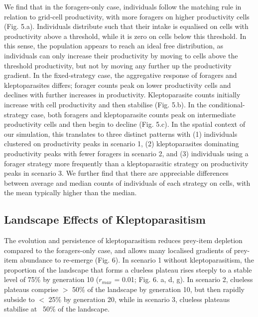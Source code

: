 \documentclass[11pt]{article}
\begin{document}
We find that in the foragers-only case, individuals follow the matching rule in relation to grid-cell productivity, with more foragers on higher productivity cells (Fig. 5.a).
Individuals distribute such that their intake is equalised on cells with productivity above a threshold, while it is zero on cells below this threshold.
In this sense, the population appears to reach an ideal free distribution, as individuals can only increase their productivity by moving to cells above the threshold productivity, but not by moving any further up the productivity gradient.
In the fixed-strategy case, the aggregative response of foragers and kleptoparasites differs; forager counts peak on lower productivity cells and declines with further increases in productivity.
Kleptoparasite counts initially increase with cell productivity and then stabilise (Fig. 5.b).
In the conditional-strategy case, both foragers and kleptoparasite counts peak on intermediate productivity cells and then begin to decline (Fig. 5.c).
In the spatial context of our simulation, this translates to three distinct patterns with (1) individuals clustered on productivity peaks in scenario 1, (2) kleptoparasites dominating productivity peaks with fewer foragers in scenario 2, and (3) individuals using a forager strategy more frequently than a kleptoparasitic strategy on productivity peaks in scenario 3.
We further find that there are appreciable differences between average and median counts of individuals of each strategy on cells, with the mean typically higher than the median.

\subsection{Landscape Effects of Kleptoparasitism}

The evolution and persistence of kleptoparasitism reduces prey-item depletion compared to the foragers-only case, and allows many localised gradients of prey-item abundance to re-emerge (Fig. 6).
In scenario 1 without kleptoparasitism, the proportion of the landscape that forms a clueless plateau rises steeply to a stable level of 75\% by generation 10 ($r_{max}$ = 0.01; Fig. 6. a, d, g).
In scenario 2, clueless plateaus comprise $>$ 50\% of the landscape by generation 10, but then rapidly subside to $<$ 25\% by generation 20, while in scenario 3, clueless plateaus stabilise at ~50\% of the landscape.

\end{document}
